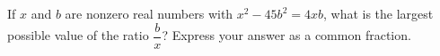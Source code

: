 If $x$ and $b$ are nonzero real numbers with $x^2-45b^2=4xb$, what is the largest possible value of the ratio $\dfrac{b}{x}$? Express your answer as a common fraction.
